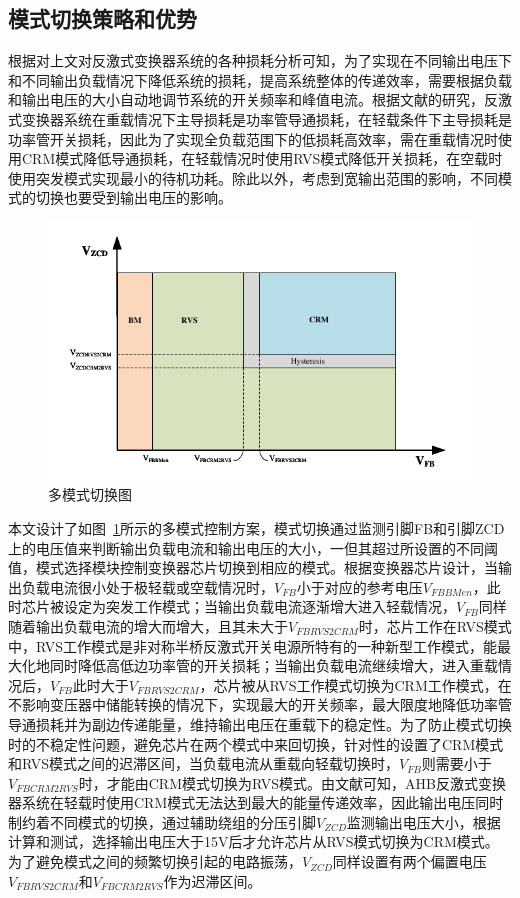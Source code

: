 \subsection{模式切换策略和优势}

根据对上文对反激式变换器系统的各种损耗分析可知，为了实现在不同输出电压下和不同输出负载情况下降低系统的损耗，提高系统整体的传递效率，需要根据负载和输出电压的大小自动地调节系统的开关频率和峰值电流。根据文献的研究，反激式变换器系统在重载情况下主导损耗是功率管导通损耗，在轻载条件下主导损耗是功率管开关损耗，因此为了实现全负载范围下的低损耗高效率，需在重载情况时使用CRM模式降低导通损耗，在轻载情况时使用RVS模式降低开关损耗，在空载时使用突发模式实现最小的待机功耗。除此以外，考虑到宽输出范围的影响，不同模式的切换也要受到输出电压的影响。

\begin{figure}[htbp] 
    \centering
    \includegraphics[width=0.8\linewidth]{figures/模式切换1.pdf}
    \caption{多模式切换图}
    \label{fig:模式切换1}
\end{figure}

本文设计了如图~\ref{fig:模式切换1}所示的多模式控制方案，模式切换通过监测引脚FB和引脚ZCD上的电压值来判断输出负载电流和输出电压的大小，一但其超过所设置的不同阈值，模式选择模块控制变换器芯片切换到相应的模式。根据变换器芯片设计，当输出负载电流很小处于极轻载或空载情况时，$V_{FB}$小于对应的参考电压$V_{FBBMen}$，此时芯片被设定为突发工作模式；当输出负载电流逐渐增大进入轻载情况，$V_{FB}$同样随着输出负载电流的增大而增大，且其未大于$V_{FBRVS2CRM}$时，芯片工作在RVS模式中，RVS工作模式是非对称半桥反激式开关电源所特有的一种新型工作模式，能最大化地同时降低高低边功率管的开关损耗；当输出负载电流继续增大，进入重载情况后，$V_{FB}$此时大于$V_{FBRVS2CRM}$，芯片被从RVS工作模式切换为CRM工作模式，在不影响变压器中储能转换的情况下，实现最大的开关频率，最大限度地降低功率管导通损耗并为副边传递能量，维持输出电压在重载下的稳定性。为了防止模式切换时的不稳定性问题，避免芯片在两个模式中来回切换，针对性的设置了CRM模式和RVS模式之间的迟滞区间，当负载电流从重载向轻载切换时，$V_{FB}$则需要小于$V_{FBCRM2RVS}$时，才能由CRM模式切换为RVS模式。由文献可知，AHB反激式变换器系统在轻载时使用CRM模式无法达到最大的能量传递效率，因此输出电压同时制约着不同模式的切换，通过辅助绕组的分压引脚$V_{ZCD}$监测输出电压大小，根据计算和测试，选择输出电压大于15V后才允许芯片从RVS模式切换为CRM模式。为了避免模式之间的频繁切换引起的电路振荡，$V_{ZCD}$同样设置有两个偏置电压$V_{FBRVS2CRM}$和$V_{FBCRM2RVS}$作为迟滞区间。

